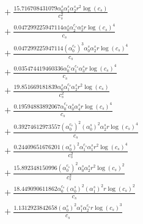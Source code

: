 \documentclass[10pt]{article}
\begin{document}
\begin{align*}
&{}  + \frac{15.716708431079 \alpha_{0}^s \alpha_{1}^s \alpha_{2}^s r^{2} \log{\left(c_{s} \right)}}{c_{s}^{2}} \\
&{}  + \frac{0.047299225947114 \alpha_{0}^s \alpha_{2}^{c_s} \alpha_{2}^s r \log{\left(c_{s} \right)}^{4}}{c_{s}} \\
&{}  + \frac{0.047299225947114 \left(\alpha_{0}^{c_s}\right)^{3} \alpha_{0}^s \alpha_{2}^s r \log{\left(c_{s} \right)}^{4}}{c_{s}} \\
&{}  + \frac{0.035474419460336 \alpha_{0}^{c_s} \alpha_{1}^{c_s} \alpha_{3}^s r \log{\left(c_{s} \right)}^{4}}{c_{s}} \\
&{}  + \frac{19.851669181839 \alpha_{0}^s \alpha_{1}^{c_s} \alpha_{2}^s r^{2} \log{\left(c_{s} \right)}}{c_{s}^{2}} \\
&{}  + \frac{0.19594883892067 \alpha_{0}^{c_s} \alpha_{0}^s \alpha_{4}^s r \log{\left(c_{s} \right)}^{4}}{c_{s}} \\
&{}  + \frac{0.39274612973557 \left(\alpha_{0}^{c_s}\right)^{2} \left(\alpha_{0}^s\right)^{2} \alpha_{2}^s r \log{\left(c_{s} \right)}^{4}}{c_{s}} \\
&{}  + \frac{0.24409651676201 \left(\alpha_{0}^s\right)^{2} \alpha_{1}^{c_s} \alpha_{1}^s r^{2} \log{\left(c_{s} \right)}^{4}}{c_{s}^{2}} \\
&{}  + \frac{15.892348150996 \left(\alpha_{0}^{c_s}\right)^{2} \alpha_{0}^s \alpha_{2}^s r^{2} \log{\left(c_{s} \right)}^{2}}{c_{s}^{2}} \\
&{}  + \frac{18.449090611862 \alpha_{0}^{c_s} \left(\alpha_{0}^s\right)^{2} \left(\alpha_{1}^s\right)^{2} r \log{\left(c_{s} \right)}^{2}}{c_{s}} \\
&{}  + \frac{1.1312923842658 \left(\alpha_{0}^s\right)^{2} \alpha_{1}^s \alpha_{2}^{c_s} r \log{\left(c_{s} \right)}^{3}}{c_{s}}
\end{align*}
\end{document}
